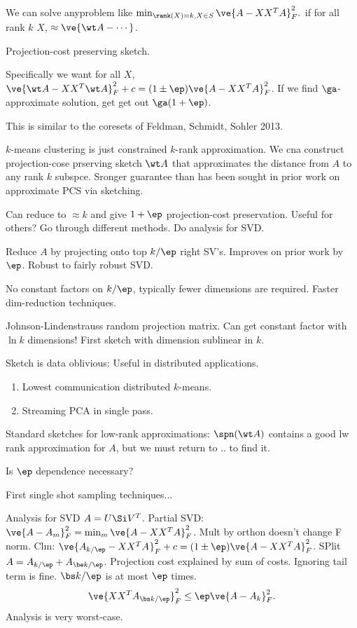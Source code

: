 We can solve anyproblem like $\min_{\rank(X)=k,X\in S}\ve{A-XX^TA}_F^2.$ if for all rank $k$ $X$, $\approx \ve{\wt A-\cdots}$. 

Projection-cost preserving sketch.

Specifically we want for all $X$, $\ve{\wt A-XX^T \wt A}_F^2 + c=(1\pm \ep)\ve{A-XX^TA}_F^2$. If we find $\ga$-approximate solution, get get out $\ga(1+\ep)$.

This is similar to the coresets of Feldman, Schmidt, Sohler 2013.

$k$-means clustering is just constrained $k$-rank approximation. 
We cna construct projection-cose prserving sketch $\wt A$ that approximates the distance from $A$ to any rank $k$ subspce. Sronger guarantee than has been sought in prior work on approximate PCS via sketching.

Can reduce to $\approx k$ and give $1+\ep$ projection-cost preservation. Useful for others? 
Go through different methods. Do analysis for SVD.

Reduce $A$ by projecting onto top $k/\ep$ right SV's. Improves on prior work by $\ep$. Robust to fairly robust SVD.

No constant factors on $k/\ep$, typically fewer dimensions are required.
Faster dim-reduction techniques. 

Johnson-Lindenstrauss random projection matrix. 
Can get constant factor with $\ln k$ dimensions! First sketch with dimension sublinear in $k$.

Sketch is data oblivious: Useful in distributed applications.
\begin{enumerate}
\item
Lowest communication distributed $k$-means.
\item Streaming PCA in single pass.
\end{enumerate}

Standard sketches for low-rank approximations: $\spn(\wt A)$ contains a good lw rank approximation for $A$, but we must return to .. to find it.

Is $\ep$ dependence necessary?

First single shot sampling techniques...

Analysis for SVD $A=U\Si V^T$.
Partial SVD: $\ve{A-A_m}_F^2 = \min_{m} \ve{A-XX^TA}_F^2$. Mult by orthon doesn't change F norm.
Clm: $\ve{A_{k/\ep}-XX^TA_{}}_F^2+c = (1\pm \ep)\ve{A-XX^T A}_F^2$. SPlit $A=A_{k/\ep}+A_{\be k/\ep}$. 
Projection cost explained by sum of costs. Ignoring tail term is fine. $\bs k/\ep$ is at most $\ep$ times. 
\[
\ve{XX^TA_{\bs k/\ep}}_F^2 \le \ep\ve{A-A_k}_F^2.
\]
Analysis is very worst-case.

